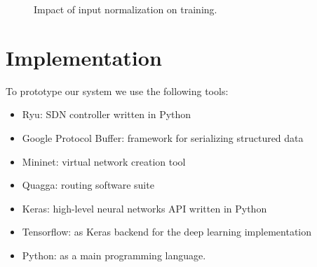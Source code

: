 \begin{figure}[]
\caption{Impact of input normalization on training.}
\label{fig:normalization_cmp}
\end{figure}

\section{Implementation}
\label{sec:implementation}
To prototype our system we use the following tools:
\begin{itemize}
\item Ryu: SDN controller written in Python~\cite{ryu}
\item Google Protocol Buffer: framework for serializing structured data~\cite{protobuf}
\item Mininet: virtual network creation tool~\cite{mininet}
\item Quagga: routing software suite~\cite{quagga}
\item Keras: high-level neural networks API written in Python~\cite{keras}
\item Tensorflow: as Keras backend for the deep learning implementation~\cite{tensorflow}
\item Python: as a main programming language.
\end{itemize}